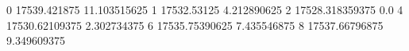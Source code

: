 0 17539.421875 11.103515625
1 17532.53125 4.212890625
2 17528.318359375 0.0
4 17530.62109375 2.302734375
6 17535.75390625 7.435546875
8 17537.66796875 9.349609375
